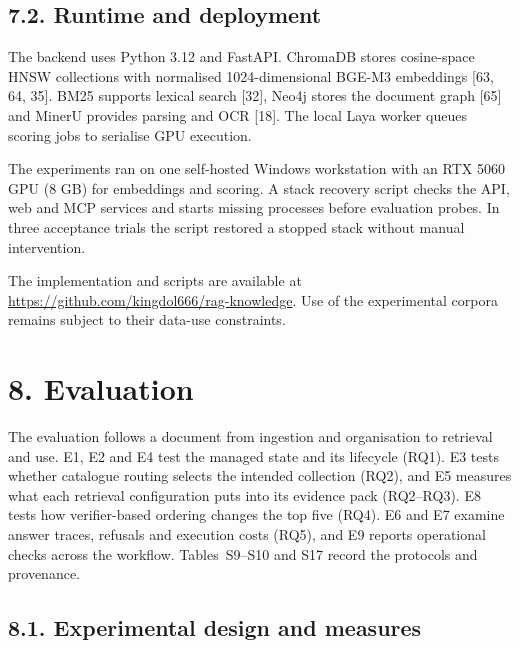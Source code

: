 \subsection{7.2. Runtime and deployment}


The backend uses Python 3.12 and FastAPI. ChromaDB stores cosine-space HNSW
collections with normalised 1024-dimensional BGE-M3 embeddings
[63, 64, 35]. BM25 supports lexical search [32], Neo4j
stores the document graph [65] and MinerU provides parsing and OCR
[18]. The local Laya worker queues scoring jobs to serialise GPU
execution.

The experiments ran on one self-hosted Windows workstation with an RTX
5060 GPU (8 GB) for embeddings and scoring. A stack recovery script checks
the API, web and MCP services and starts missing processes before evaluation
probes. In three acceptance trials the script restored a stopped stack
without manual intervention.

The implementation and scripts are available at
\url{https://github.com/kingdol666/rag-knowledge}. Use of the experimental
corpora remains subject to their data-use constraints.


\section{8. Evaluation}

The evaluation follows a document from ingestion and organisation to
retrieval and use. E1, E2 and E4 test the managed state and its lifecycle
(RQ1). E3 tests whether catalogue routing selects the intended collection
(RQ2), and E5 measures what each retrieval configuration puts into its
evidence pack (RQ2--RQ3). E8 tests how verifier-based ordering changes the
top five (RQ4). E6 and E7 examine answer traces, refusals and execution
costs (RQ5), and E9 reports operational checks across the workflow.
Tables~S9--S10 and S17 record the protocols and provenance.

\subsection{8.1. Experimental design and measures}


